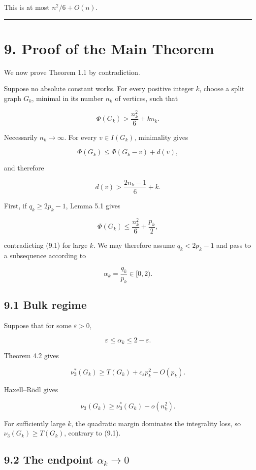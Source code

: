\documentclass[11pt,a4paper]{article}
\begin{document}
This is at most \(n^2/6+O(n)\).

\begin{center}\rule{0.5\linewidth}{0.5pt}\end{center}

\section{9. Proof of the Main Theorem}\label{proof-of-the-main-theorem}

We now prove Theorem 1.1 by contradiction.

Suppose no absolute constant works. For every positive integer \(k\), choose a split graph \(G_k\), minimal in its number \(n_k\) of vertices, such that

\[
\Phi(G_k)
>
\frac{n_k^2}{6}+kn_k.
\tag{9.1}
\]

Necessarily \(n_k\to\infty\). For every \(v\in I(G_k)\), minimality gives

\[
\Phi(G_k)
\le
\Phi(G_k-v)+d(v),
\]

and therefore

\[
\boxed{
d(v)>
\frac{2n_k-1}{6}+k.
}
\tag{9.2}
\]

First, if \(q_k\ge2p_k-1\), Lemma 5.1 gives

\[
\Phi(G_k)
\le
\frac{n_k^2}{6}+\frac{p_k}{2},
\]

contradicting (9.1) for large \(k\). We may therefore assume \(q_k<2p_k-1\) and pass to a subsequence according to

\[
\alpha_k=\frac{q_k}{p_k}\in[0,2).
\]

\subsection{9.1 Bulk regime}\label{bulk-regime}

Suppose that for some \(\varepsilon>0\),

\[
\varepsilon\le\alpha_k\le2-\varepsilon.
\]

Theorem 4.2 gives

\[
\nu_3^*(G_k)
\ge
T(G_k)+c_\varepsilon p_k^2-O(p_k).
\]

Haxell--Rödl gives

\[
\nu_3(G_k)
\ge
\nu_3^*(G_k)-o(n_k^2).
\]

For sufficiently large \(k\), the quadratic margin dominates the integrality loss, so \(\nu_3(G_k)\ge T(G_k)\), contrary to (9.1).

\subsection{\texorpdfstring{9.2 The endpoint \(\alpha_k\to0\)}{9.2 The endpoint \textbackslash alpha\_k\textbackslash to0}}\label{the-endpoint-alpha_kto0}
\end{document}
